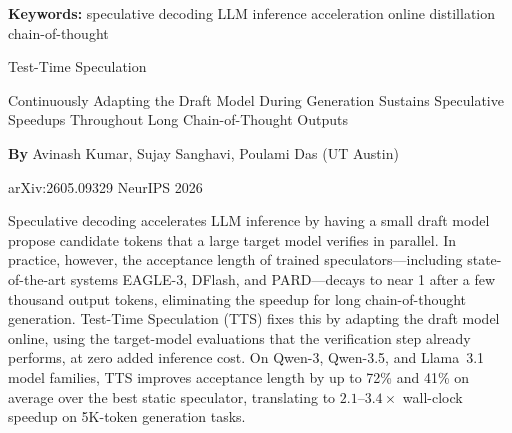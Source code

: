 \documentclass[10pt,twocolumn]{article}
\begin{document}
\setlength{\parindent}{0pt}
\setlength{\parskip}{4pt}

{\small\color{keywordgray}\textbf{Keywords:}
  speculative decoding \textbullet{}
  LLM inference acceleration \textbullet{}
  online distillation \textbullet{}
  chain-of-thought}\par\vspace{4pt}

{\LARGE\bfseries\raggedright
  Test-Time Speculation}\par\vspace{4pt}

{\large\itshape\raggedright
  Continuously Adapting the Draft Model During Generation Sustains
  Speculative Speedups Throughout Long Chain-of-Thought Outputs}\par\vspace{6pt}

{\small\textbf{By} Avinash Kumar, Sujay Sanghavi, Poulami Das
  (UT Austin)}\par\vspace{2pt}

{\small\color{keywordgray}arXiv:2605.09329 \textbullet{}
  NeurIPS 2026}
\par\vspace{2pt}\noindent{\color{rulered}\rule{\columnwidth}{0.6pt}}\vspace{6pt}

Speculative decoding accelerates LLM inference by having a small draft
model propose candidate tokens that a large target model verifies in
parallel. In practice, however, the acceptance length of trained
speculators---including state-of-the-art systems EAGLE-3, DFlash, and
PARD---decays to near 1 after a few thousand output tokens, eliminating
the speedup for long chain-of-thought generation. Test-Time Speculation
(TTS) fixes this by adapting the draft model online, using the
target-model evaluations that the verification step already performs, at
zero added inference cost. On Qwen-3, Qwen-3.5, and Llama~3.1 model
families, TTS improves acceptance length by up to 72\% and 41\% on average
over the best static speculator, translating to $2.1$--$3.4\times$ wall-clock
speedup on 5K-token generation tasks.
\end{document}
